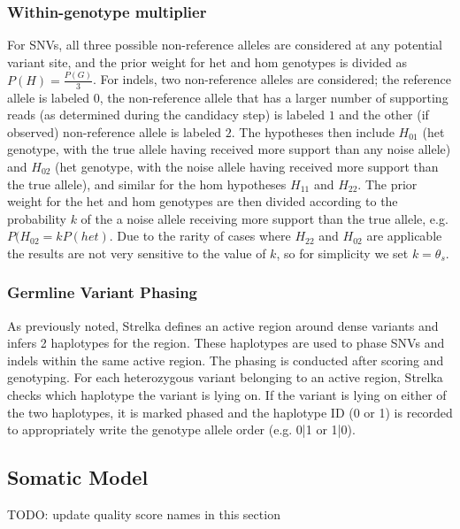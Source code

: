 \documentclass{article}
\begin{document}
\subsubsection{Within-genotype multiplier}
For SNVs, all three possible non-reference alleles are considered at any potential variant site, and the prior weight for het and hom genotypes is divided as $P(H) = \frac{P(G)}{3}$. For indels, two non-reference alleles are considered; the reference allele is labeled $0$, the non-reference allele that has a larger number of supporting reads (as determined during the candidacy step) is labeled $1$ and the other (if observed) non-reference allele is labeled $2$. The hypotheses then include $H_{01}$ (het genotype, with the true allele having received more support than any noise allele) and $H_{02}$ (het genotype, with the noise allele having received more support than the true allele), and similar for the hom hypotheses $H_{11}$ and $H_{22}$. The prior weight for the het and hom genotypes are then divided according to the probability $k$ of the a noise allele receiving more support than the true allele, e.g. $P(H_{02} = kP(het)$. Due to the rarity of cases where $H_{22}$ and $H_{02}$ are applicable the results are not very sensitive to the value of $k$, so for simplicity we set $k=\theta_s$.


\subsubsection{Germline Variant Phasing}
\label{sec:ReadBackedPhasing}
As previously noted, Strelka defines an active region around dense variants and infers 2 haplotypes for the region. These haplotypes are used to phase SNVs and indels within the same active region. The phasing is conducted after scoring and genotyping. For each heterozygous variant belonging to an active region, Strelka checks which haplotype the variant is lying on. If the variant is lying on either of the two haplotypes, it is marked phased and the haplotype ID (0 or 1) is recorded to appropriately write the genotype allele order (e.g. 0|1 or 1|0).


\subsection{Somatic Model}
\label{sec:somatic}

TODO: update quality score names in this section
\end{document}
